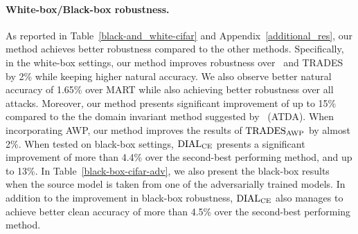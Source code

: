 \paragraph{White-box/Black-box robustness.} 
As reported in Table~\ref{black-and_white-cifar} and Appendix~\ref{additional_res}, our method achieves better robustness compared to the other methods. Specifically, in the white-box settings, our method improves robustness over~\citet{madry2017towards} and TRADES by 2\% 
while keeping higher natural accuracy. We also observe better natural accuracy of 1.65\% over MART while also achieving better robustness over all attacks. Moreover, our method presents significant improvement of up to 15\% compared to the the domain invariant method suggested by~\citet{song2018improving} (ATDA).
When incorporating 
AWP, our method improves the results of $\operatorname{TRADES}_{\operatorname{AWP}}$ by almost 2\%.
When tested on black-box settings, $\operatorname{DIAL}_{\operatorname{CE}}$ presents a significant improvement of more than 4.4\% over the second-best performing method, and up to 13\%. In Table~\ref{black-box-cifar-adv}, we also present the black-box results when the source model is taken from one of the adversarially trained models. %
In addition to the improvement in black-box robustness, $\operatorname{DIAL}_{\operatorname{CE}}$ also manages to achieve better clean accuracy of more than 4.5\% over the second-best performing method.

